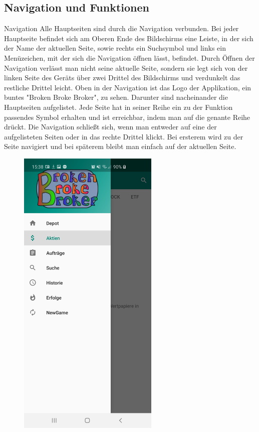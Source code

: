 \documentclass[10pt]{scrartcl}
\begin{document}
\subsection{Navigation und Funktionen}

Navigation
Alle Hauptseiten sind durch die Navigation verbunden. Bei jeder Hauptseite befindet sich am Oberen Ende des Bildschirms eine Leiste, in der sich der Name der aktuellen Seite, sowie rechts ein Suchsymbol und  links ein Menüzeichen, mit der sich die Navigation öffnen lässt, befindet. Durch Öffnen der Navigation verlässt man nicht seine aktuelle Seite, sondern sie legt sich von der linken Seite des Geräts über zwei Drittel des Bildschirms und verdunkelt das restliche Drittel leicht. 
Oben in der Navigation ist das Logo der Applikation, ein buntes "Broken Broke Broker", zu sehen. Darunter sind nacheinander die Hauptseiten aufgelistet. Jede Seite hat in seiner Reihe ein zu der Funktion passendes Symbol erhalten und ist erreichbar, indem man auf die genante Reihe drückt. Die Navigation schließt sich, wenn man entweder auf eine der aufgelisteten Seiten oder in das rechte Drittel klickt. Bei ersterem wird zu der Seite navigiert und bei späterem bleibt man einfach auf der aktuellen Seite.

\begin{figure}[H]
	\centering
	\includegraphics[width=0.6\textwidth]{Bilder/Applikation/Navigation.jpg}
\end{figure}
\end{document}
